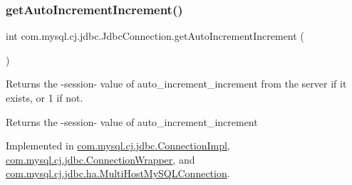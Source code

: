 \mbox{\label{interfacecom_1_1mysql_1_1cj_1_1jdbc_1_1_jdbc_connection_a06ded1274e682178c67fdb86f09fed5a}} 
\subsubsection{\texorpdfstring{get\+Auto\+Increment\+Increment()}{getAutoIncrementIncrement()}}
{\footnotesize\ttfamily int com.\+mysql.\+cj.\+jdbc.\+Jdbc\+Connection.\+get\+Auto\+Increment\+Increment (\begin{DoxyParamCaption}{ }\end{DoxyParamCaption})}

Returns the -\/session-\/ value of \textquotesingle{}auto\+\_\+increment\+\_\+increment\textquotesingle{} from the server if it exists, or \textquotesingle{}1\textquotesingle{} if not.

\begin{DoxyReturn}{Returns}
the -\/session-\/ value of \textquotesingle{}auto\+\_\+increment\+\_\+increment\textquotesingle{} 
\end{DoxyReturn}


Implemented in \mbox{\hyperlink{classcom_1_1mysql_1_1cj_1_1jdbc_1_1_connection_impl_a47d3fb6ffbaaff0190ea15e3c35d7270}{com.\+mysql.\+cj.\+jdbc.\+Connection\+Impl}}, \mbox{\hyperlink{classcom_1_1mysql_1_1cj_1_1jdbc_1_1_connection_wrapper_a0855a0981bb14e92fee22c3591d95175}{com.\+mysql.\+cj.\+jdbc.\+Connection\+Wrapper}}, and \mbox{\hyperlink{classcom_1_1mysql_1_1cj_1_1jdbc_1_1ha_1_1_multi_host_my_s_q_l_connection_a94d28c91c18c2c57cd4ec7855a3d061d}{com.\+mysql.\+cj.\+jdbc.\+ha.\+Multi\+Host\+My\+S\+Q\+L\+Connection}}.

\mbox{\label{interfacecom_1_1mysql_1_1cj_1_1jdbc_1_1_jdbc_connection_a248df459ef314e3a79257c7bd6dc560a}} 
